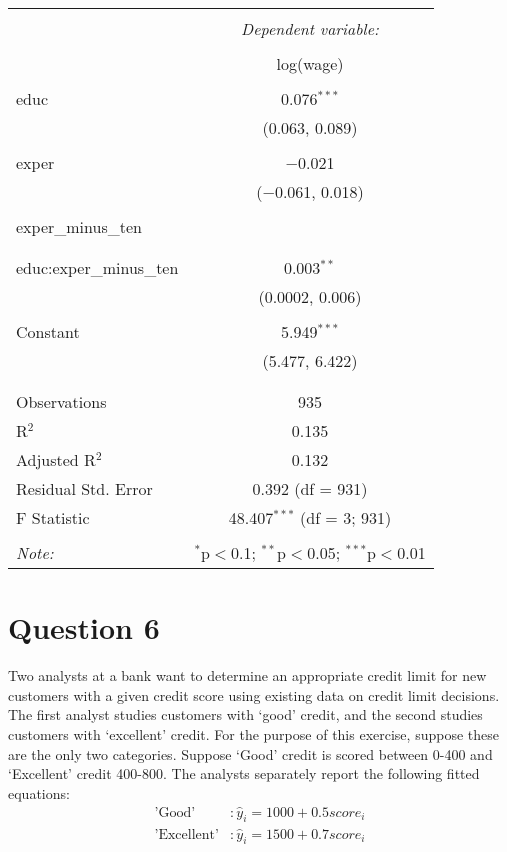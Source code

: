 \documentclass[
]{article}
\begin{document}
\begin{table}[!htbp] \centering 
  \caption{} 
  \label{} 
\begin{tabular}{@{\extracolsep{5pt}}lc} 
\\[-1.8ex]\hline 
\hline \\[-1.8ex] 
 & \multicolumn{1}{c}{\textit{Dependent variable:}} \\ 
\cline{2-2} 
\\[-1.8ex] & log(wage) \\ 
\hline \\[-1.8ex] 
 educ & 0.076$^{***}$ \\ 
  & (0.063, 0.089) \\ 
  & \\ 
 exper & $-$0.021 \\ 
  & ($-$0.061, 0.018) \\ 
  & \\ 
 exper\_minus\_ten &  \\ 
  &  \\ 
  & \\ 
 educ:exper\_minus\_ten & 0.003$^{**}$ \\ 
  & (0.0002, 0.006) \\ 
  & \\ 
 Constant & 5.949$^{***}$ \\ 
  & (5.477, 6.422) \\ 
  & \\ 
\hline \\[-1.8ex] 
Observations & 935 \\ 
R$^{2}$ & 0.135 \\ 
Adjusted R$^{2}$ & 0.132 \\ 
Residual Std. Error & 0.392 (df = 931) \\ 
F Statistic & 48.407$^{***}$ (df = 3; 931) \\ 
\hline 
\hline \\[-1.8ex] 
\textit{Note:}  & \multicolumn{1}{r}{$^{*}$p$<$0.1; $^{**}$p$<$0.05; $^{***}$p$<$0.01} \\ 
\end{tabular} 
\end{table}

\hypertarget{question-6}{%
\section{Question 6}\label{question-6}}

Two analysts at a bank want to determine an appropriate credit limit for
new customers with a given credit score using existing data on credit
limit decisions. The first analyst studies customers with `good' credit,
and the second studies customers with `excellent' credit. For the
purpose of this exercise, suppose these are the only two categories.
Suppose `Good' credit is scored between 0-400 and `Excellent' credit
400-800. The analysts separately report the following fitted equations:
\[\begin{aligned}
\text{'Good'}&: \hat y_i = 1000 + 0.5 score_i \\
\text{'Excellent'}&: \hat y_i = 1500 + 0.7 score_i
\end{aligned}\]
\end{document}
